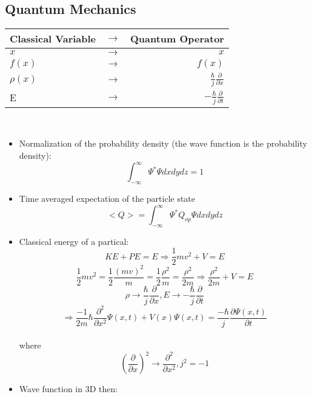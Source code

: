 \documentclass{article}
\begin{document}
\subsection{Quantum Mechanics}
\begin{tabular}{lcr}
  Classical Variable & $\rightarrow$ & Quantum Operator\\
  \hline
  $x$ & $\rightarrow$ & $x$\\
  $f(x)$ & $\rightarrow$ & $f(x)$\\
  $\rho(x)$ &$ \rightarrow$ & $\frac{\hbar}{j} \frac{\partial}{\partial x}$\\
  E & $\rightarrow$ & $-\frac{\hbar}{j} \frac{\partial}{\partial t}$\\
  \hline
\end{tabular}\\
\begin{itemize}
\item Normalization of the probability density (the wave function is the probability density):
  \begin{equation}
    \label{Normalization_of_the_wave_function}
    \int_{-\infty}^{\infty} \Psi^{*}\Psi dxdydz=1
  \end{equation}
\item Time averaged expectation of the particle state
  \begin{equation}
    \label{Time_average_of_the_state}
    <Q>=\int_{-\infty}^{\infty}\Psi^{*}Q_{op}\Psi dxdydz
  \end{equation}
\item Classical energy of a partical:\begin{equation} \label{classical_energy_of_a_partical}
  KE+PE=E\Rightarrow\frac{1}{2}mv^2 + V = E\end{equation}
  \begin{equation}
    \label{part_2}
    \frac{1}{2}mv^2=\frac{1}{2}\frac{(mv)^2}{m}=\frac{1}{2}\frac{\rho^2}{m}=
    \frac{\rho^2}{2m}\Rightarrow\frac{\rho^2}{2m}+V=E
  \end{equation}
  $$\rho\rightarrow\frac{\hbar}{j}\frac{\partial}{\partial x},E\rightarrow -\frac{\hbar}{j}\frac{\partial}{\partial t}$$$$\Rightarrow \frac{-1}{2m}\hbar\frac{\partial^2}{\partial x^2}\Psi(x,t)+V(x)\Psi(x,t)=\frac{-\hbar}{j}\frac{\partial\Psi(x,t)}{\partial t}$$ \\ 
  where $$(\frac{\partial}{\partial x})^2\rightarrow\frac{\partial^2}{\partial x^2}, j^2 = -1$$
\item Wave function in 3D then:
  \begin{equation}\label{3D_wave_function}

\end{equation}
\end{itemize}
\end{document}
